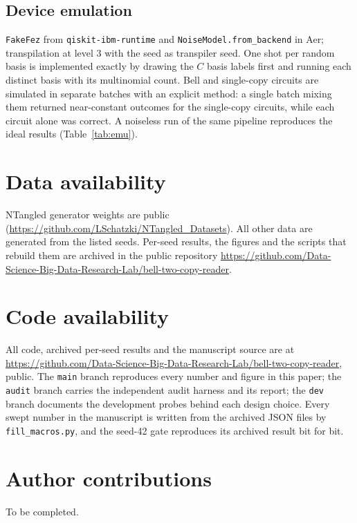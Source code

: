\documentclass[11pt,a4paper]{article}
\begin{document}
\subsection{Device emulation}
\texttt{FakeFez} from \texttt{qiskit-ibm-runtime} and \texttt{NoiseModel.from\_backend} in Aer;
transpilation at level $3$ with the seed as transpiler seed. One shot per random basis is
implemented exactly by drawing the $C$ basis labels first and running each distinct basis with its
multinomial count. Bell and single-copy circuits are simulated in separate batches with an explicit
method: a single batch mixing them returned near-constant outcomes for the single-copy circuits,
while each circuit alone was correct. A noiseless run of the same pipeline reproduces the ideal
results (Table~\ref{tab:emu}).

\section*{Data availability}
NTangled generator weights are public (\url{https://github.com/LSchatzki/NTangled_Datasets}). All
other data are generated from the listed seeds. Per-seed results, the figures and the scripts
that rebuild them are archived in the public repository
\url{https://github.com/Data-Science-Big-Data-Research-Lab/bell-two-copy-reader}.

\section*{Code availability}
\begin{sloppypar}
All code, archived per-seed results and the manuscript source are at
\url{https://github.com/Data-Science-Big-Data-Research-Lab/bell-two-copy-reader}, public. The \texttt{main} branch reproduces
every number and figure in this paper; the \texttt{audit} branch carries the independent audit
harness and its report; the \texttt{dev} branch documents the development probes behind each design
choice. Every swept number in the manuscript is written from the archived JSON files by
\texttt{fill\_macros.py}, and the seed-42 gate reproduces its archived result bit for bit.
\end{sloppypar}

\section*{Author contributions}
To be completed.
\end{document}

